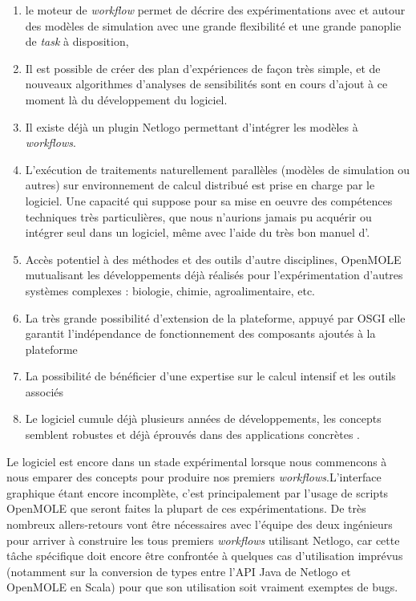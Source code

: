 \begin{enumerate}[label=(\alph*),labelindent=\parindent,leftmargin=*]
\item le moteur de \textit{workflow} permet de décrire des expérimentations avec et autour des modèles de simulation avec une grande flexibilité et une grande panoplie de \textit{task} à disposition,
\item Il est possible de créer des plan d'expériences de façon très simple, et de nouveaux algorithmes d'analyses de sensibilités sont en cours d'ajout à ce moment là du développement du logiciel.
\item Il existe déjà un plugin Netlogo permettant d'intégrer les modèles à \textit{workflows}.
\item L'exécution de traitements naturellement parallèles (modèles de simulation ou autres) sur environnement de calcul distribué est prise en charge par le logiciel. Une capacité qui suppose pour sa mise en oeuvre des compétences techniques très particulières, que nous n'aurions jamais pu acquérir ou intégrer seul dans un logiciel, même avec l'aide du très bon manuel d'\textcite{Openshaw2000}.
\item Accès potentiel à des méthodes et des outils d'autre disciplines, OpenMOLE mutualisant les développements déjà réalisés pour l'expérimentation d'autres systèmes complexes : biologie, chimie, agroalimentaire, etc.
\item La très grande possibilité d'extension de la plateforme, appuyé par OSGI elle garantit l'indépendance de fonctionnement des composants ajoutés à la plateforme
\item La possibilité de bénéficier d'une expertise sur le calcul intensif et les outils associés
\item Le logiciel cumule déjà plusieurs années de développements, les concepts semblent robustes et déjà éprouvés dans des applications concrètes \autocite{Mesmoudi2010}.
\end{enumerate}

Le logiciel est encore dans un stade expérimental lorsque nous commencons à nous emparer des concepts pour produire nos premiers \textit{workflows}.L'interface graphique étant encore incomplète, c'est principalement par l'usage de scripts OpenMOLE que seront faites la plupart de ces expérimentations. De très nombreux allers-retours vont être nécessaires avec l'équipe des deux ingénieurs pour arriver à construire les tous premiers \textit{workflows} utilisant Netlogo, car cette tâche spécifique doit encore être confrontée à quelques cas d'utilisation imprévus (notamment sur la conversion de types entre l'API Java de Netlogo et OpenMOLE en Scala) pour que son utilisation soit vraiment exemptes de bugs.

